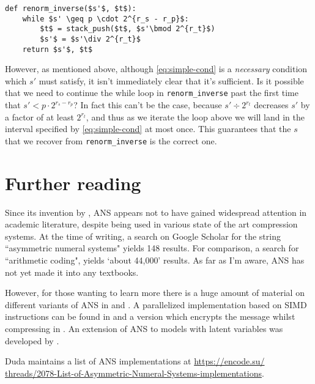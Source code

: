 \documentclass{article}
\begin{document}
\begin{lstlisting}
def renorm_inverse($s'$, $t$):
    while $s' \geq p \cdot 2^{r_s - r_p}$:
        $t$ = stack_push($t$, $s'\bmod 2^{r_t}$)
        $s'$ = $s'\div 2^{r_t}$
    return $s'$, $t$
\end{lstlisting}

However, as mentioned above, although \cref{eq:simple-cond} is a
\emph{necessary} condition which \(s'\) must satisfy, it isn't immediately
clear that it's sufficient. Is it possible that we need to continue the while
loop in \texttt{renorm\_inverse} past the first time that \(s'<p\cdot2^{r_s -
r_p}\)? In fact this can't be the case, because \(s'\div2^{r_t}\) decreases
\(s'\) by a factor of at least \(2^{r_t}\), and thus as we iterate the loop
above we will land in the interval specified by \cref{eq:simple-cond} at most
once. This guarantees that the \(s\) that we recover from
\texttt{renorm\_inverse} is the correct one.

\section{Further reading}
Since its invention by \citet{duda2009}, ANS appears not to have gained
widespread attention in academic literature, despite being used in various
state of the art compression systems. At the time of writing, a search on
Google Scholar for the string ``asymmetric numeral systems" yields 148 results.
For comparison, a search for ``arithmetic coding", yields `about 44,000'
results. As far as I'm aware, ANS has not yet made it into any textbooks.

However, for those wanting to learn more there is a huge amount of material on
different variants of ANS in \citet{duda2009} and \citet{duda2015}. A
parallelized implementation based on SIMD instructions can be found in
\citet{giesen2014} and a version which encrypts the message whilst compressing
in \citet{duda2016}.  An extension of ANS to models with latent variables was
developed by \citet{townsend2019}.

Duda maintains a list of ANS implementations at
\url{
  https://encode.su/
  threads/2078-List-of-Asymmetric-Numeral-Systems-implementations}.
\printbibliography
\end{document}
